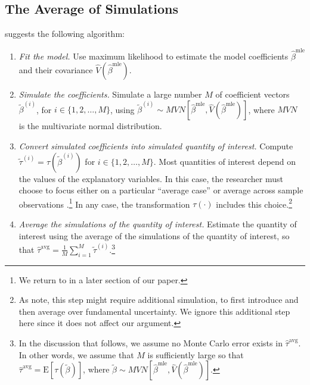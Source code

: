 \documentclass[11pt]{article}
\begin{document}
\subsection*{The Average of Simulations}

\cite{KingTomzWittenberg2000} suggests the following algorithm:\vspace{.1in}

\begin{enumerate}
\item \textit{Fit the model.}
Use maximum likelihood to estimate the model coefficients $\hat{\beta}^{\text{mle}}$ and their covariance $\hat{V} \left( \hat{\beta}^{\text{mle}} \right)$.
\item \textit{Simulate the coefficients.}
Simulate a large number $M$ of coefficient vectors $\tilde{\beta}^{(i)}$, for $i \in \{1, 2,\ldots, M\}$, using $\tilde{\beta}^{(i)} \sim MVN \left[ \hat{\beta}^{\text{mle}}, \hat{V} \left( \hat{\beta}^{\text{mle}} \right) \right]$, where $MVN$ is the multivariate normal distribution.
\item \textit{Convert simulated coefficients into simulated quantity of interest.}
Compute $\tilde{\tau}^{(i)} = \tau \left( \tilde{\beta}^{(i)} \right)$ for $i \in \{1, 2,\ldots, M\}$.
Most quantities of interest depend on the values of the explanatory variables.
In this case, the researcher must choose to focus either on a particular ``average case'' or average across sample observations \citep{HanmerKalkan2013}.\footnote{We return to \cite{HanmerKalkan2013} in a later section of our paper.}
In any case, the transformation $\tau(\cdot)$ includes this choice.\footnote{As \cite{KingTomzWittenberg2000} note, this step might require additional simulation, to first introduce and then average over fundamental uncertainty.
We ignore this additional step here since it does not affect our argument.}
\item \textit{Average the simulations of the quantity of interest.}
Estimate the quantity of interest using the average of the simulations of the quantity of interest, so that $\hat{\tau}^{\text{avg}} = \frac{1}{M} \sum_{i = 1}^{M} \tilde{\tau}^{(i)}$.\footnote{In the discussion that follows, we assume no Monte Carlo error exists in $\hat{\tau}^{\text{avg}}$.
In other words, we assume that $M$ is sufficiently large so that $\hat{\tau}^{\text{avg}} = \text{E}\left[ \tau \left(\tilde{\beta} \right) \right]$, where $\tilde{\beta} \sim MVN \left[ \hat{\beta}^{\text{mle}}, \hat{V} \left( \hat{\beta}^{\text{mle}} \right) \right]$.}\\
\end{enumerate}
\end{document}
